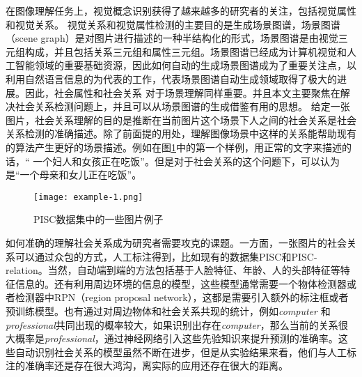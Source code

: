 在图像理解任务上，视觉概念识别获得了越来越多的研究者的关注，包括视觉属性和视觉关系\cite{lu2016visual}。
视觉关系和视觉属性检测的主要目的是生成场景图谱，场景图谱（scene graph）\cite{johnson2015image}是对图片进行描述的一种半结构化的形式，场景图谱是由视觉三元组构成，并且包括关系三元组和属性三元组。场景图谱已经成为计算机视觉和人工智能领域的重要基础资源，因此如何自动的生成场景图谱成为了重要关注点，以利用自然语言信息的\cite{lu2016visual}为代表的工作，代表场景图谱自动生成领域取得了极大的进展。因此，社会属性和社会关系\cite{wang2010seeing} 对于场景理解同样重要。并且本文主要聚焦在解决社会关系检测问题上，并且可以从场景图谱的生成借鉴有用的思想。
给定一张图片，社会关系理解的目的是推断在当前图片这个场景下人之间的社会关系是社会关系检测的准确描述。除了前面提的用处，理解图像场景中这样的关系能帮助现有的算法产生更好的场景描述。例如在图\ref{fig:intro-example}中的第一个样例，用正常的文字来描述的话，`` 一个妇人和女孩正在吃饭''。但是对于社会关系的这个问题下，可以认为是``一个母亲和女儿正在吃饭''。
\begin{figure}[htpb]
	\centering
	\texttt{[image: example-1.png]}
    \caption{PISC数据集中的一些图片例子}
	\vspace*{-3.5mm}
	\label{fig:intro-example}
\end{figure}

如何准确的理解社会关系成为研究者需要攻克的课题。一方面，一张图片的社会关系可以通过众包的方式，人工标注得到，比如现有的数据集PISC\cite{li2017dual-glance}和PISC-relation\cite{sun2017a}。当然，自动端到端的方法包括基于人脸特征、年龄、人的头部特征等特征信息的\cite{sun2017a,zhang2015learning}。还有利用周边环境的信息的模型\cite{li2017dual-glance,wang2018deep}，这些模型通常需要一个物体检测器或者检测器中RPN（region proposal network），这都是需要引入额外的标注框或者预训练模型。也有通过对周边物体和社会关系共现的统计，例如{\it computer} 和{\it professional}共同出现的概率较大，如果识别出存在{\it computer}，那么当前的关系很大概率是{\it professional}，通过神经网络引入这些先验知识来提升预测的准确率。这些自动识别社会关系的模型虽然不断在进步，但是从实验结果来看，他们与人工标注的准确率还是存在很大鸿沟，离实际的应用还存在很大的距离。

